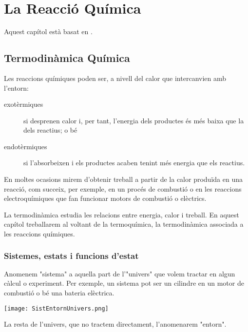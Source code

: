\chapter{La Reacció Química}

Aquest capítol està basat en \citep{caamano_ros_quimica_1991,yen_chemistry_2008,dickerson_principios_1993}.

\section{Termodinàmica Química}

Les reaccions químiques poden ser, a nivell del calor que intercanvien amb l'entorn:
\begin{description}
\item[exotèrmiques] si desprenen calor i, per tant, l'energia dels productes és més baixa que la dels reactius; o bé
\item[endotèrmiques] si l'absorbeixen i els productes acaben tenint més energia que els reactius.
\end{description}

En moltes ocasions mirem d'obtenir treball a partir de la calor produïda en una reacció, com succeix, per exemple, en un procés de combustió o en les reaccions electroquímiques que fan funcionar motors de combustió o elèctrics.

La termodinàmica estudia les relacions entre energia, calor i treball.
En aquest capítol treballarem al voltant de la termoquímica, la termodinàmica associada a les reaccions químiques. 


\subsection{Sistemes, estats i funcions d'estat}

Anomenem "sistema" a aquella part de l'"univers" que volem tractar en algun càlcul o experiment. 
Per exemple, un sistema pot ser un cilindre en un motor de combustió o bé una bateria elèctrica.
\begin{center}
\texttt{[image: SistEntornUnivers.png]}
\end{center}
La resta de l'univers, que no tractem directament, l'anomenarem "entorn".

